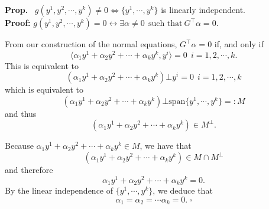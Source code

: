 \documentclass[letterpaper]{article}
\begin{document}
%
%

%

\newpage

\noindent \textbf{Prop.}~ $g(y^1,y^2,\cdots,y^k) \neq 0 \Leftrightarrow \{ y^1,\cdots, y^k \}$ is linearly independent.\\

\noindent \textbf{Proof:} $g(y^1,y^2,\cdots,y^k) = 0 \leftrightarrow \exists \alpha \neq 0~~\text{such that}~ G^\top \alpha =0$.

From our construction of the normal equations,  $G^\top \alpha = 0$ if, and only if
$$  \langle \alpha_1 y^1+ \alpha_2 y^2+\cdots +\alpha_k y^k, y^i \rangle  = 0     ~~   i=1,2,\cdots ,k.$$
This is equivalent to
$$  \left( \alpha_1 y^1+ \alpha_2 y^2+ \cdots +\alpha_k y^k \right) \bot  y^i = 0     ~~   i=1,2,\cdots ,k$$
which is equivalent to
$$  \left( \alpha_1 y^1+ \alpha_2 y^2+ \cdots + \alpha_k y^k \right) \bot  \textrm{span} \{ y^1, \cdots, y^k \}=:M $$
and thus
$$\left( \alpha_1 y^1+ \alpha_2 y^2+ \cdots + \alpha_k y^k \right) \in M^\perp.$$

Because $\alpha_1 y^1+ \alpha_2 y^2+\cdots +\alpha_k y^k \in M$, we have that
$$\left( \alpha_1 y^1+ \alpha_2 y^2+\cdots +\alpha_k y^k  \right) \in M \cap M^\perp $$
and therefore
$$  \alpha_1 y^1+ \alpha_2 y^2+\cdots +\alpha_k y^k  = 0. $$ By the linear independence of
$\{ y^1,\cdots, y^k \}$, we deduce that $$\alpha_1 = \alpha_2 = \cdots \alpha_k = 0.\ \square$$
\end{document}
